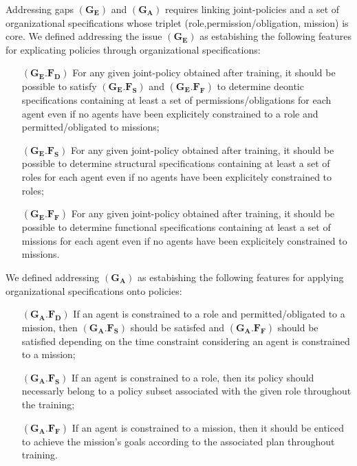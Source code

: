 \documentclass[runningheads]{llncs}
\begin{document}
Addressing gaps $(\mathbf{G_E})$ and $(\mathbf{G_A})$ requires linking joint-policies and a set of organizational specifications whose triplet (role,permission/obligation, mission) is core. We defined addressing the issue $(\mathbf{G_E})$ as estabishing the following features for explicating policies through organizational specifications:
%
\begin{itemize}[wide, labelsep = 1em]
    \item[$(\mathbf{G_E.F_D})$] For any given joint-policy obtained after training, it should be possible to satisfy $(\mathbf{G_E.F_S})$ and $(\mathbf{G_E.F_F})$ to determine deontic specifications containing at least a set of permissions/obligations for each agent even if no agents have been explicitely constrained to a role and permitted/obligated to missions;
    \item[$(\mathbf{G_E.F_S})$] For any given joint-policy obtained after training, it should be possible to determine structural specifications containing at least a set of  roles for each agent even if no agents have been explicitely constrained to roles;
    \item[$(\mathbf{G_E.F_F})$] For any given joint-policy obtained after training, it should be possible to determine functional specifications containing at least a set of  missions for each agent even if no agents have been explicitely constrained to missions.
\end{itemize}

\noindent We defined addressing $(\mathbf{G_A})$ as estabishing the following features for applying organizational specifications onto policies:
%
\begin{itemize}[wide, labelsep = 1em]
    \item[$(\mathbf{G_A.F_D})$] If an agent is constrained to a role and permitted/obligated to a mission, then $(\mathbf{G_A.F_S})$ should be satisfed and $(\mathbf{G_A.F_F})$ should be satisfied depending on the time constraint considering an agent is constrained to a mission;
    \item[$(\mathbf{G_A.F_S})$] If an agent is constrained to a role, then its policy should necessarly belong to a policy subset associated with the given role throughout the training;
    \item[$(\mathbf{G_A.F_F})$] If an agent is constrained to a mission, then it should be enticed to achieve the mission's goals according to the associated plan throughout training.
\end{itemize}
\end{document}
